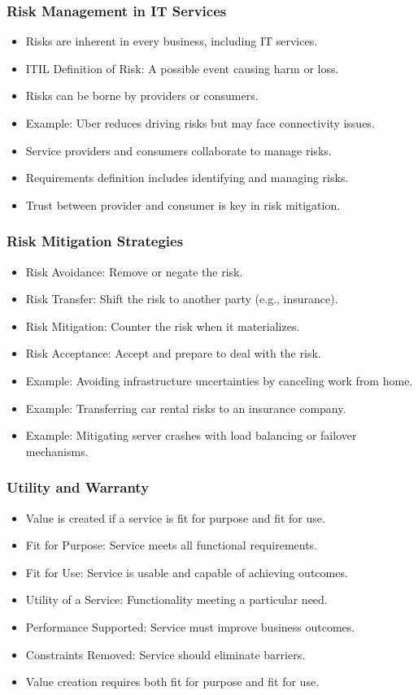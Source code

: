 \documentclass[aspectratio=169, table]{beamer}
\begin{document}
\begin{frame}
	\frametitle{Risk Management in IT Services}
	\begin{itemize}
		\item Risks are inherent in every business, including IT services.
		\item ITIL Definition of Risk: A possible event causing harm or loss.
		\item Risks can be borne by providers or consumers.
		\item Example: Uber reduces driving risks but may face connectivity issues.
		\item Service providers and consumers collaborate to manage risks.
		\item Requirements definition includes identifying and managing risks.
		\item Trust between provider and consumer is key in risk mitigation.
	\end{itemize}
\end{frame}

\begin{frame}
	\frametitle{Risk Mitigation Strategies}
	\begin{itemize}
		\item Risk Avoidance: Remove or negate the risk.
		\item Risk Transfer: Shift the risk to another party (e.g., insurance).
		\item Risk Mitigation: Counter the risk when it materializes.
		\item Risk Acceptance: Accept and prepare to deal with the risk.
		\item Example: Avoiding infrastructure uncertainties by canceling work from home.
		\item Example: Transferring car rental risks to an insurance company.
		\item Example: Mitigating server crashes with load balancing or failover mechanisms.
	\end{itemize}
\end{frame}

\begin{frame}
	\frametitle{Utility and Warranty}
	\begin{itemize}
		\item Value is created if a service is fit for purpose and fit for use.
		\item Fit for Purpose: Service meets all functional requirements.
		\item Fit for Use: Service is usable and capable of achieving outcomes.
		\item Utility of a Service: Functionality meeting a particular need.
		\item Performance Supported: Service must improve business outcomes.
		\item Constraints Removed: Service should eliminate barriers.
		\item Value creation requires both fit for purpose and fit for use.
	\end{itemize}
\end{frame}
\end{document}
